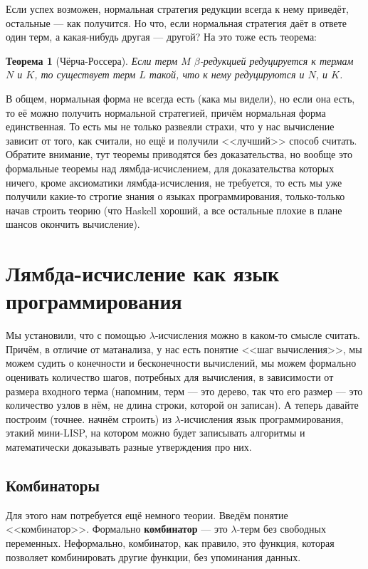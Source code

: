 \documentclass[a5paper]{article}
\newtheorem{rustheorem}{Теорема}
\begin{document}
Если успех возможен, нормальная стратегия редукции всегда к нему приведёт, остальные --- как получится. Но что, если нормальная стратегия даёт в ответе один терм, а какая-нибудь другая --- другой? На это тоже есть теорема: 

\begin{rustheorem}[Чёрча-Россера]
    Если терм $M$ $\beta$-редукцией редуцируется к термам $N$ и $K$, то существует терм $L$ такой, что к нему редуцируются и $N$, и $K$.
\end{rustheorem}

В общем, нормальная форма не всегда есть (кака мы видели), но если она есть, то её можно получить нормальной стратегией, причём нормальная форма единственная. То есть мы не только развеяли страхи, что у нас вычисление зависит от того, как считали, но ещё и получили <<лучший>> способ считать. Обратите внимание, тут теоремы приводятся без доказательства, но вообще это формальные теоремы над лямбда-исчислением, для доказательства которых ничего, кроме аксиоматики лямбда-исчисления, не требуется, то есть мы уже получили какие-то строгие знания о языках программирования, только-только начав строить теорию (что Haskell хороший, а все остальные плохие в плане шансов окончить вычисление).

\section{Лямбда-исчисление как язык программирования}

Мы установили, что с помощью $\lambda$-исчисления можно в каком-то смысле считать. Причём, в отличие от матанализа, у нас есть понятие <<шаг вычисления>>, мы можем судить о конечности и бесконечности вычислений, мы можем формально оценивать количество шагов, потребных для вычисления, в зависимости от размера входного терма (напомним, терм --- это дерево, так что его размер --- это количество узлов в нём, не длина строки, которой он записан). А теперь давайте построим (точнее. начнём строить) из $\lambda$-исчисления язык программирования, этакий мини-LISP, на котором можно будет записывать алгоритмы и математически доказывать разные утверждения про них.

\subsection{Комбинаторы}

Для этого нам потребуется ещё немного теории. Введём понятие <<комбинатор>>. Формально \textbf{комбинатор} --- это $\lambda$-терм без свободных переменных. Неформально, комбинатор, как правило, это функция, которая позволяет комбинировать другие функции, без упоминания данных.
\end{document}
